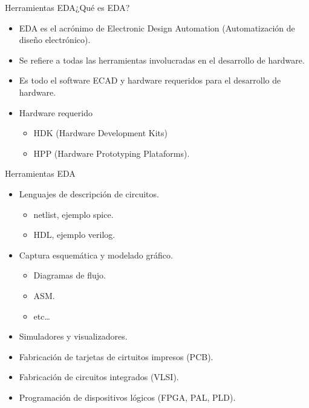 \message{ !name(alternativa.tex)}\documentclass{beamer}
\begin{document}
\begin{frame}{Herramientas EDA}{¿Qué es EDA?}
  \begin{itemize}
  \item EDA es el acrónimo de Electronic Design Automation (Automatización de diseño electrónico).
  \item Se refiere a todas las herramientas involucradas en el desarrollo de hardware.
  \item Es todo el software ECAD y hardware requeridos para el desarrollo de hardware.
  \item Hardware requerido
    \begin{itemize}
    \item HDK (Hardware Development Kits)
    \item HPP (Hardware Prototyping Plataforms).
    \end{itemize}
  \end{itemize}
\end{frame}

\begin{frame}{Herramientas EDA}
  \begin{itemize}
  \item Lenguajes de descripción de circuitos.
    \begin{itemize}
    \item netlist, ejemplo spice.
    \item HDL, ejemplo verilog.
    \end{itemize}
    \vspace{9pt}
  \item Captura esquemática y modelado gráfico.
    \begin{itemize}
    \item Diagramas de flujo.
    \item ASM.
    \item etc\dots{}
    \end{itemize}

    \vspace{9pt}
  \item Simuladores y visualizadores.
    \vspace{9pt}
  \item Fabricación de tarjetas de cirtuitos impresos (PCB).
  \item Fabricación de circuitos integrados (VLSI).
  \item Programación de dispositivos lógicos (FPGA, PAL, PLD).
  \end{itemize}
\end{frame}
\end{document}
